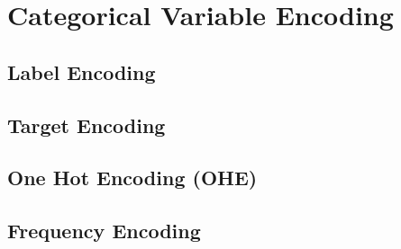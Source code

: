 \chapter{Categorical Variable Encoding}

\section{Label Encoding}

\section{Target Encoding}

\section{One Hot Encoding (OHE)}

\section{Frequency Encoding}
